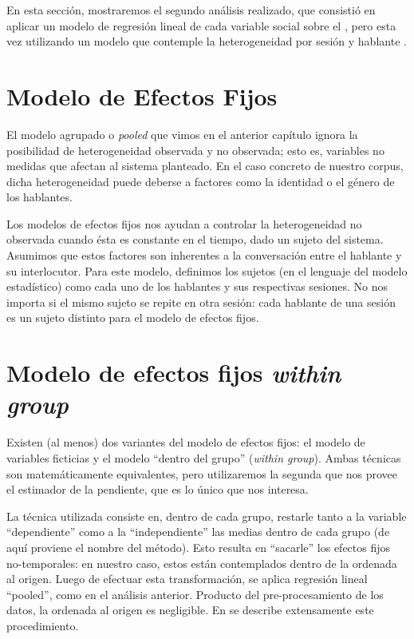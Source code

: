 En esta sección, mostraremos el segundo análisis realizado, que consistió en aplicar un modelo de regresión lineal de cada variable social sobre el \absentrainment, pero esta vez utilizando un modelo que contemple la heterogeneidad por sesión y hablante .

\section{Modelo de Efectos Fijos}


\newcommand{\slopeestim}[1] { $\estslope \sim #1$ }

El modelo agrupado o \emph{pooled} que vimos en el anterior capítulo ignora la posibilidad de heterogeneidad observada y no observada; esto es, variables no medidas que afectan al sistema planteado. En el caso concreto de nuestro corpus, dicha heterogeneidad puede deberse a factores como la identidad o el género de los hablantes.

Los modelos de efectos fijos nos ayudan a controlar la heterogeneidad no observada cuando ésta es constante en el tiempo, dado un sujeto del sistema. Asumimos que estos factores son inherentes a la conversación entre el hablante y su interlocutor. Para este modelo, definimos los sujetos (en el lenguaje del modelo estadístico) como cada uno de los hablantes y sus respectivas sesiones. No nos importa si el mismo sujeto se repite en otra sesión: cada hablante de una sesión es un sujeto distinto para el modelo de efectos fijos.


\section{Modelo de efectos fijos \emph{within group}}

Existen (al menos) dos variantes del modelo de efectos fijos: el modelo de variables ficticias y el modelo ``dentro del grupo'' (\emph{within group}). Ambas técnicas son matemáticamente equivalentes, pero utilizaremos la segunda que nos provee el estimador de la pendiente, que es lo único que nos interesa.

La técnica utilizada consiste en, dentro de cada grupo, restarle tanto a la variable ``dependiente'' como a la ``independiente'' las medias dentro de cada grupo (de aquí proviene el nombre del método). Esto resulta en ``sacarle'' los efectos fijos no-temporales: en nuestro caso, estos están contemplados dentro de la ordenada al origen. Luego de efectuar esta transformación, se aplica regresión lineal ``pooled'', como en el análisis anterior. Producto del pre-procesamiento de los datos, la ordenada al origen es negligible. En \cite[chap 16]{gujarati1999} se describe extensamente este procedimiento.


